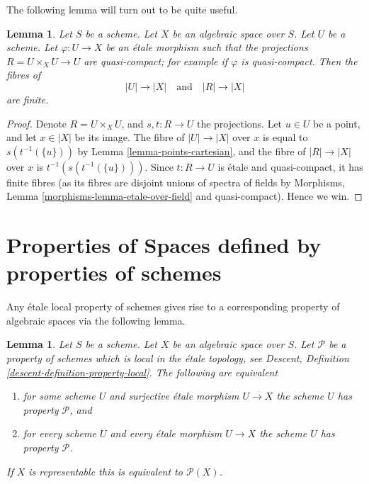 \documentclass{stacks-project}
\theoremstyle{plain}
\newtheorem{lemma}[subsection]{Lemma}
\theoremstyle{definition}
\theoremstyle{remark}
\numberwithin{equation}{subsection}
\begin{document}
\noindent
The following lemma will turn out to be quite useful.

\begin{lemma}
\label{lemma-finite-fibres-presentation}
Let $S$ be a scheme.
Let $X$ be an algebraic space over $S$.
Let $U$ be a scheme. Let $\varphi : U \to X$ be an \'etale morphism such that
the projections $R = U \times_X U \to U$ are quasi-compact; for example if
$\varphi$ is quasi-compact. Then the fibres of
$$
|U| \to |X|
\quad\text{and}\quad
|R| \to |X|
$$
are finite.
\end{lemma}

\begin{proof}
Denote $R = U \times_X U$, and $s, t : R \to U$ the projections.
Let $u \in U$ be a point, and let $x \in |X|$ be its image.
The fibre of $|U| \to |X|$ over $x$ is equal to
$s(t^{-1}(\{u\}))$ by
Lemma \ref{lemma-points-cartesian},
and the fibre of $|R| \to |X|$ over $x$ is $t^{-1}(s(t^{-1}(\{u\})))$.
Since $t : R \to U$ is \'etale and quasi-compact, it has finite fibres
(as its fibres are disjoint unions of spectra of fields by
Morphisms, Lemma \ref{morphisms-lemma-etale-over-field}
and quasi-compact). Hence we win.
\end{proof}








\section{Properties of Spaces defined by properties of schemes}
\label{section-types-properties}

\noindent
Any \'etale local property of schemes gives rise to a corresponding
property of algebraic spaces via the following lemma.

\begin{lemma}
\label{lemma-type-property}
Let $S$ be a scheme.
Let $X$ be an algebraic space over $S$.
Let $\mathcal{P}$ be a property of schemes which is local in the \'etale
topology, see
Descent, Definition \ref{descent-definition-property-local}.
The following are equivalent
\begin{enumerate}
\item for some scheme $U$ and surjective \'etale morphism $U \to X$
the scheme $U$ has property $\mathcal{P}$, and
\item for every scheme $U$ and every \'etale morphism $U \to X$
the scheme $U$ has property $\mathcal{P}$.
\end{enumerate}
If $X$ is representable this is equivalent to $\mathcal{P}(X)$.
\end{lemma}
\end{document}
